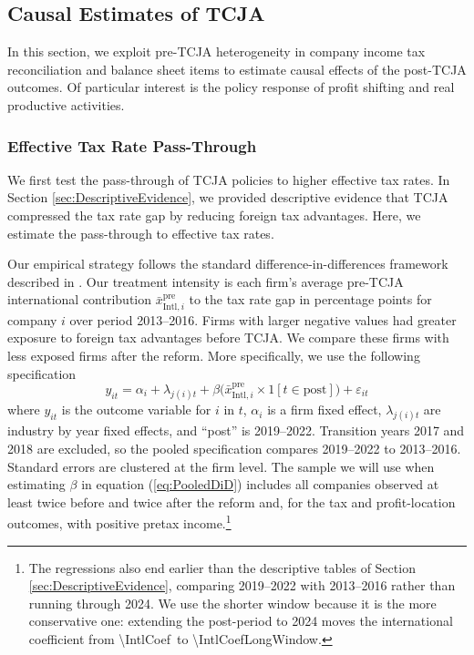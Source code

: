 \documentclass[11pt,letterpaper]{article}
\newcommand{\CoefNum}[1]{\num[round-mode=places,round-precision=3]{#1}}
\begin{document}
\subsection{Causal Estimates of TCJA}

In this section, we exploit pre-TCJA heterogeneity in 
company income tax reconciliation and balance sheet items to estimate
causal effects of the post-TCJA outcomes. Of particular interest
is the policy response of profit shifting and real productive activities.

\subsubsection{Effective Tax Rate Pass-Through\label{sec:EffectiveTaxRate}} 


We first test the pass-through of TCJA policies to higher
effective tax rates. In Section \ref{sec:DescriptiveEvidence},
we provided descriptive evidence that TCJA compressed the
tax rate gap by reducing foreign tax advantages. Here, we
estimate the pass-through to effective tax rates. 

Our empirical strategy follows the standard difference-in-differences framework 
described in \citet{AngristPischke2009}. 
Our treatment intensity is each firm's average pre-TCJA international 
contribution $\bar x^{\text{pre}}_{\text{Intl},i}$ to the tax rate gap
in percentage points for company $i$ over period 2013--2016.
Firms with larger negative values 
had greater exposure to foreign tax advantages before TCJA. 
We compare these firms with less exposed firms after the reform.
More specifically, we use the following specification
\begin{equation}
  y_{it} =
  \alpha_i+\lambda_{j(i)t}
  +\beta
  \bigl(\bar x^{\text{pre}}_{\text{Intl},i}\times 1[t\in \text{post}]\bigr)
  +\varepsilon_{it}
\label{eq:PooledDiD}
\end{equation}
where $y_{it}$ is the outcome variable for $i$ in $t$, 
$\alpha_i$ is a firm fixed effect,
$\lambda_{j(i)t}$ are industry by year fixed effects, and 
``post'' is 2019--2022.
Transition years 2017 and 2018 are excluded, so the pooled
specification compares 2019--2022 to 2013--2016. Standard
errors are clustered at the firm level. 
The sample we will use when estimating $\beta$ in equation (\ref{eq:PooledDiD})
includes all companies observed at least twice before and twice after
the reform and, for the tax and profit-location outcomes, with positive
pretax income.\footnote{%
The regressions also end earlier than the descriptive tables of Section
\ref{sec:DescriptiveEvidence}, comparing 2019--2022 with 2013--2016
rather than running through 2024. We use the shorter window because it
is the more conservative one: extending the post-period to 2024 moves
the international coefficient from \CoefNum{\IntlCoef}\ to
\CoefNum{\IntlCoefLongWindow}.}
\end{document}
